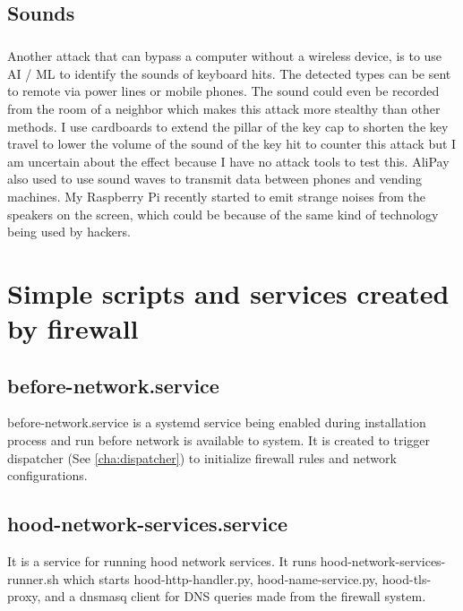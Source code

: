 \documentclass[mscthesis]{usiinfthesis}
\begin{document}
\section{Sounds}

\paragraph{}
Another attack that can bypass a computer without a wireless device, is to use AI / ML to identify the sounds of keyboard hits. The detected types can be sent to remote via power lines or mobile phones. The sound could even be recorded from the room of a neighbor which makes this attack more stealthy than other methods. I use cardboards to extend the pillar of the key cap to shorten the key travel to lower the volume of the sound of the key hit to counter this attack but I am uncertain about the effect because I have no attack tools to test this. AliPay also used to use sound waves to transmit data between phones and vending machines. My Raspberry Pi recently started to emit strange noises from the speakers on the screen, which could be because of the same kind of technology being used by hackers.

\appendix %

\chapter{Simple scripts and services created by firewall}

\section{before-network.service}\label{sec:before-network-service}
before-network.service is a systemd service being enabled during installation process and run before network is available to system. It is created to trigger dispatcher (See \cref{cha:dispatcher}) to initialize firewall rules and network configurations.

\section{hood-network-services.service}\label{sec:hood-network-services.service}
It is a service for running hood network services. It runs hood-network-services-runner.sh which starts hood-http-handler.py, hood-name-service.py, hood-tls-proxy, and a dnsmasq client for DNS queries made from the firewall system.
\end{document}
